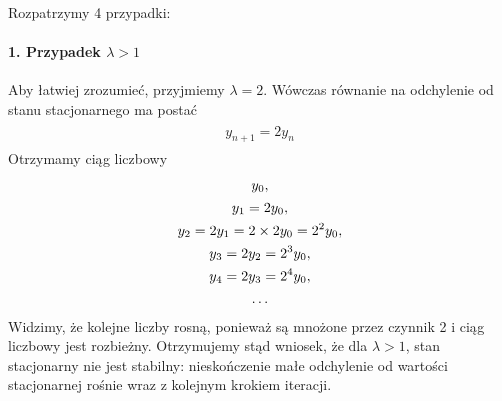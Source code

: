\documentclass[a4paper,12pt,polish]{sphinxmanual}
\begin{document}
Rozpatrzymy 4 przypadki:


\paragraph{1. Przypadek $\lambda  > 1$}
\label{ch1/chI031:przypadek}
Aby łatwiej zrozumieć, przyjmiemy  $\lambda =  2$. Wówczas równanie na odchylenie od stanu stacjonarnego ma postać
\label{ch1/chI031:equation-eqn20}\begin{gather}
\begin{split}y_{n+1} = 2 y_n\end{split}\label{ch1/chI031-eqn20}
\end{gather}
Otrzymamy ciąg liczbowy
\label{ch1/chI031:equation-eqn21}\begin{gather}
\begin{split} y_0,\end{split}\label{ch1/chI031-eqn21}\\\begin{split} y_1 =   2 y_0,\end{split}\notag\\\begin{split} y_2 =  2 y_1 =  2 \times 2 y_0 = 2^2 y_0,\end{split}\notag\\\begin{split} y_3 =  2 y_2 = 2^3 y_0,\end{split}\notag\\\begin{split} y_4 =  2 y_3 = 2^4 y_0,\end{split}\notag\\\begin{split} \dots\end{split}\notag
\end{gather}
Widzimy, że  kolejne  liczby rosną, ponieważ są mnożone przez czynnik 2 i ciąg liczbowy jest rozbieżny. Otrzymujemy stąd wniosek, że dla $\lambda > 1$, stan stacjonarny nie jest stabilny: nieskończenie małe odchylenie od wartości stacjonarnej rośnie wraz z kolejnym krokiem iteracji.
\end{document}
